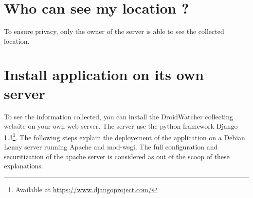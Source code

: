 \section{Who can see my location ?}

To ensure privacy, only the owner of the server is able to see the collected location.

\section{Install application on its own server}

To see the information collected, you can install the DroidWatcher collecting website on your own web server.
The server use the python framework Django 1.3\footnote{Available at \url{https://www.djangoproject.com/}}.
The following steps explain the deployement of the application on a Debian Lenny server running Apache and mod-wsgi. The full configuration and securitization of the apache server is considered as out of the scoop of these explanations.

